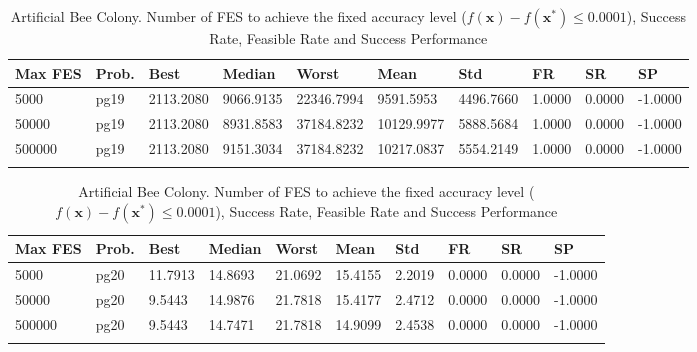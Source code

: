 \documentclass[10pt, a4paper]{book}
\begin{document}
\begin{center}
\begin{longtable}{l l l l l l l l l l}
\textbf{Max FES} & \textbf{Prob.} & \textbf{Best} & \textbf{Median} & \textbf{Worst} & \textbf{Mean} & \textbf{Std} & \textbf{FR} & \textbf{SR} & \textbf{SP} \\
\hline
5000 & pg19 & 2113.2080 & 9066.9135 & 22346.7994 & 9591.5953 & 4496.7660 & 1.0000 & 0.0000 & -1.0000 \\
50000 & pg19 & 2113.2080 & 8931.8583 & 37184.8232 & 10129.9977 & 5888.5684 & 1.0000 & 0.0000 & -1.0000 \\
500000 & pg19 & 2113.2080 & 9151.3034 & 37184.8232 & 10217.0837 & 5554.2149 & 1.0000 & 0.0000 & -1.0000 \\

\caption{ Artificial Bee Colony. Number of FES to achieve the fixed accuracy level ($f(\mathbf{x}) - f(\mathbf{x}^{*}) \leq 0.0001$), Success Rate, Feasible Rate and Success Performance }
\end{longtable}
\end{center}

\begin{center}
\begin{longtable}{l l l l l l l l l l}
\textbf{Max FES} & \textbf{Prob.} & \textbf{Best} & \textbf{Median} & \textbf{Worst} & \textbf{Mean} & \textbf{Std} & \textbf{FR} & \textbf{SR} & \textbf{SP} \\
\hline
5000 & pg20 & 11.7913 & 14.8693 & 21.0692 & 15.4155 & 2.2019 & 0.0000 & 0.0000 & -1.0000 \\
50000 & pg20 & 9.5443 & 14.9876 & 21.7818 & 15.4177 & 2.4712 & 0.0000 & 0.0000 & -1.0000 \\
500000 & pg20 & 9.5443 & 14.7471 & 21.7818 & 14.9099 & 2.4538 & 0.0000 & 0.0000 & -1.0000 \\

\caption{ Artificial Bee Colony. Number of FES to achieve the fixed accuracy level ($f(\mathbf{x}) - f(\mathbf{x}^{*}) \leq 0.0001$), Success Rate, Feasible Rate and Success Performance }
\end{longtable}
\end{center}
\end{document}
